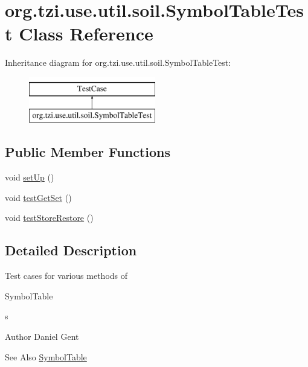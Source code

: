 \hypertarget{classorg_1_1tzi_1_1use_1_1util_1_1soil_1_1_symbol_table_test}{\section{org.\-tzi.\-use.\-util.\-soil.\-Symbol\-Table\-Test Class Reference}
\label{classorg_1_1tzi_1_1use_1_1util_1_1soil_1_1_symbol_table_test}
}
Inheritance diagram for org.\-tzi.\-use.\-util.\-soil.\-Symbol\-Table\-Test\-:\begin{figure}[H]
\begin{center}
\leavevmode
\includegraphics[height=2.000000cm]{classorg_1_1tzi_1_1use_1_1util_1_1soil_1_1_symbol_table_test}
\end{center}
\end{figure}
\subsection*{Public Member Functions}
\begin{DoxyCompactItemize}
\item 
void \hyperlink{classorg_1_1tzi_1_1use_1_1util_1_1soil_1_1_symbol_table_test_af69116e975266f03704e05cdc90f0487}{set\-Up} ()
\item 
void \hyperlink{classorg_1_1tzi_1_1use_1_1util_1_1soil_1_1_symbol_table_test_a53053fb27e126172eaf6fdce39bebe21}{test\-Get\-Set} ()
\item 
void \hyperlink{classorg_1_1tzi_1_1use_1_1util_1_1soil_1_1_symbol_table_test_a0507b62aec29b597e3f83827e80dd2a7}{test\-Store\-Restore} ()
\end{DoxyCompactItemize}


\subsection{Detailed Description}
Test cases for various methods of
\begin{DoxyCode}
SymbolTable 
\end{DoxyCode}
 s

\begin{DoxyAuthor}{Author}
Daniel Gent 
\end{DoxyAuthor}
\begin{DoxySeeAlso}{See Also}
\hyperlink{classorg_1_1tzi_1_1use_1_1util_1_1soil_1_1_symbol_table}{Symbol\-Table} 
\end{DoxySeeAlso}



